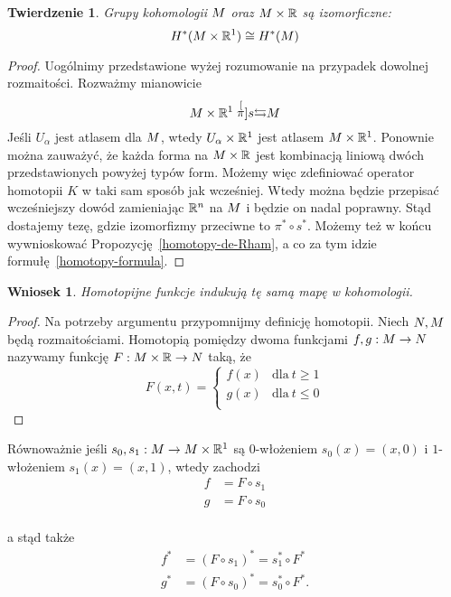 \documentclass[licencjacka]{pracamgr}
\theoremstyle{definition}
\theoremstyle{definition}
\theoremstyle{plain}
\theoremstyle{plain}
\theoremstyle{plain}
\newtheorem{theorem}{Twierdzenie}[section]
\theoremstyle{plain}
\newtheorem{wniosek}{Wniosek}[section]
\def\M{\ensuremath M}
\def\N{\ensuremath N}
\def\R{\ensuremath\mathbb{R}}
\begin{document}
\begin{theorem}
Grupy kohomologii $\M$ oraz $\M \times \R$ są izomorficzne:
\[
H^\ast( \M \times \R^1) \cong H^\ast( \M)
\]
\end{theorem}
\begin{proof}
Uogólnimy przedstawione wyżej rozumowanie na przypadek dowolnej
rozmaitości. Rozważmy mianowicie
\[
 \M \times \R^1 \stackrel[\pi]{s}{\leftrightarrows} \M
\]
Jeśli ${U_\alpha}$ jest atlasem dla $\M$, wtedy ${U_\alpha \times \R^1}$ jest
atlasem $\M \times \R^1$. Ponownie można zauważyć, że każda forma na $\M \times
\R$ jest kombinacją liniową dwóch przedstawionych powyżej typów form.  Możemy
więc zdefiniować operator homotopii $K$ w taki sam sposób jak wcześniej.  Wtedy
można będzie przepisać wcześniejszy dowód zamieniając $\R^n$ na $\M$ i będzie
on nadal poprawny.
 Stąd dostajemy tezę, gdzie izomorfizmy przeciwne to $\pi^\ast \circ
s^\ast$. Możemy też w końcu wywnioskować Propozycję~\ref{homotopy-de-Rham}, a co
za tym idzie formułę~\ref{homotopy-formula}.
\end{proof}

\begin{wniosek}
Homotopijne funkcje indukują tę samą mapę w kohomologii.
\end{wniosek}
\begin{proof}
Na potrzeby argumentu przypomnijmy definicję homotopii.  Niech $\N, \M$ będą
rozmaitościami.  Homotopią pomiędzy dwoma funkcjami $f,g: \M \rightarrow \N$
nazywamy funkcję $F: \M \times \R \rightarrow \N$ taką, że
\[
F(x,t) = 
\begin{cases}
f(x) & \text{dla}~t \geq 1 \\
g(x) & \text{dla}~t \leq 0 \\
\end{cases}
\]
\end{proof}
Równoważnie jeśli $s_0,s_1: \M \rightarrow  \M \times \R^1$ są $0$-włożeniem
$s_0(x) = (x, 0)$ i $1$-włożeniem $s_1(x) = (x,1)$, wtedy zachodzi
\begin{align*}
f &= F \circ s_1 \\
g &= F \circ s_0 \\
\end{align*}

a stąd także
\begin{align*}
f^\ast &= (F \circ s_1)^\ast = s_1^\ast \circ F^\ast \\
g^\ast &= (F \circ s_0)^\ast = s_0^\ast \circ F^\ast. \\
\end{align*}
\end{document}
